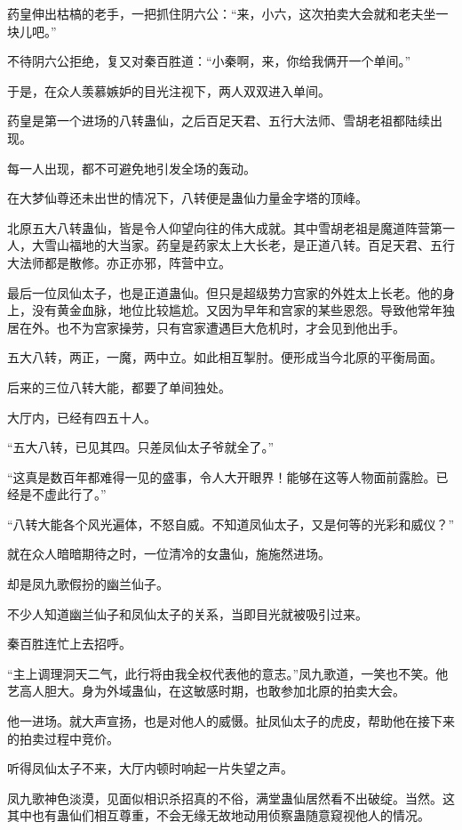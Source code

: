 \begin{this_body}
药皇伸出枯槁的老手，一把抓住阴六公：“来，小六，这次拍卖大会就和老夫坐一块儿吧。”

不待阴六公拒绝，复又对秦百胜道：“小秦啊，来，你给我俩开一个单间。”

于是，在众人羡慕嫉妒的目光注视下，两人双双进入单间。

药皇是第一个进场的八转蛊仙，之后百足天君、五行大法师、雪胡老祖都陆续出现。

每一人出现，都不可避免地引发全场的轰动。

在大梦仙尊还未出世的情况下，八转便是蛊仙力量金字塔的顶峰。

北原五大八转蛊仙，皆是令人仰望向往的伟大成就。其中雪胡老祖是魔道阵营第一人，大雪山福地的大当家。药皇是药家太上大长老，是正道八转。百足天君、五行大法师都是散修。亦正亦邪，阵营中立。

最后一位凤仙太子，也是正道蛊仙。但只是超级势力宫家的外姓太上长老。他的身上，没有黄金血脉，地位比较尴尬。又因为早年和宫家的某些恩怨。导致他常年独居在外。也不为宫家操劳，只有宫家遭遇巨大危机时，才会见到他出手。

五大八转，两正，一魔，两中立。如此相互掣肘。便形成当今北原的平衡局面。

后来的三位八转大能，都要了单间独处。

大厅内，已经有四五十人。

“五大八转，已见其四。只差凤仙太子爷就全了。”

“这真是数百年都难得一见的盛事，令人大开眼界！能够在这等人物面前露脸。已经是不虚此行了。”

“八转大能各个风光遍体，不怒自威。不知道凤仙太子，又是何等的光彩和威仪？”

就在众人暗暗期待之时，一位清冷的女蛊仙，施施然进场。

却是凤九歌假扮的幽兰仙子。

不少人知道幽兰仙子和凤仙太子的关系，当即目光就被吸引过来。

秦百胜连忙上去招呼。

“主上调理洞天二气，此行将由我全权代表他的意志。”凤九歌道，一笑也不笑。他艺高人胆大。身为外域蛊仙，在这敏感时期，也敢参加北原的拍卖大会。

他一进场。就大声宣扬，也是对他人的威慑。扯凤仙太子的虎皮，帮助他在接下来的拍卖过程中竞价。

听得凤仙太子不来，大厅内顿时响起一片失望之声。

凤九歌神色淡漠，见面似相识杀招真的不俗，满堂蛊仙居然看不出破绽。当然。这其中也有蛊仙们相互尊重，不会无缘无故地动用侦察蛊随意窥视他人的情况。


\end{this_body}
